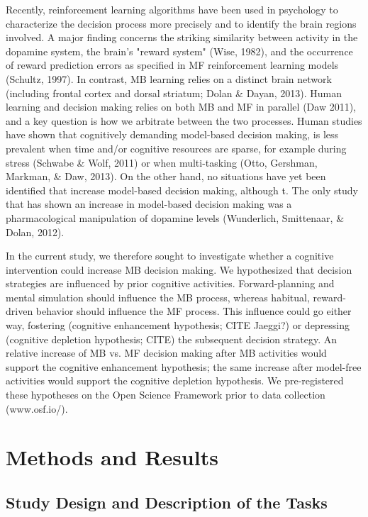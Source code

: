 \documentclass[11pt]{article} %
\begin{document}
Recently, reinforcement learning algorithms have been used in psychology to characterize the decision process more precisely and to identify the brain regions involved. A major finding concerns the striking similarity between activity in the dopamine system, the brain's "reward system" (Wise, 1982), and the occurrence of reward prediction errors as specified in MF reinforcement learning models (Schultz, 1997). In contrast, MB learning relies on a distinct brain network (including frontal cortex and dorsal striatum; Dolan \& Dayan, 2013). Human learning and decision making relies on both MB and MF in parallel (Daw 2011), and a key question is how we arbitrate between the two processes. Human studies have shown that cognitively demanding model-based decision making, is less prevalent when time and/or cognitive resources are sparse, for example during stress (Schwabe \& Wolf, 2011) or when multi-tasking (Otto, Gershman, Markman, \& Daw, 2013). On the other hand, no situations have yet been identified that increase model-based decision making, although t. The only study that has shown an increase in model-based decision making was a pharmacological manipulation of dopamine levels (Wunderlich, Smittenaar, \& Dolan, 2012). 

In the current study, we therefore sought to investigate whether a cognitive intervention could increase MB decision making. We hypothesized that decision strategies are influenced by prior cognitive activities. Forward-planning and mental simulation should influence the MB process, whereas habitual, reward-driven behavior should influence the MF process. This influence could go either way, fostering (cognitive enhancement hypothesis; CITE Jaeggi?) or depressing (cognitive depletion hypothesis; CITE) the subsequent decision strategy. An relative increase of MB vs. MF decision making after MB activities would support the cognitive enhancement hypothesis; the same increase after model-free activities would support the cognitive depletion hypothesis. We pre-registered these hypotheses on the Open Science Framework prior to data collection (www.osf.io/).

\section{Methods and Results}
\subsection{Study Design and Description of the Tasks}
\end{document}
